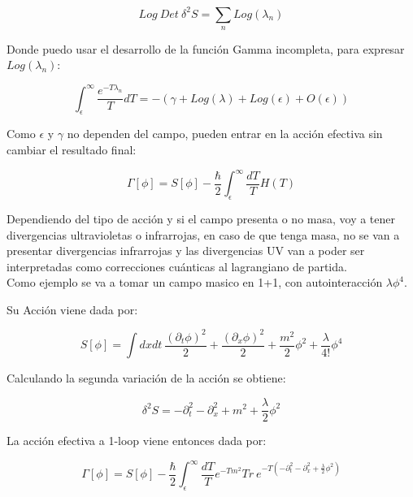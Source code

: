 \begin{equation}
Log \ Det \ \delta ^2 S = 
\sum _n Log( \lambda _n )
\end{equation}

Donde puedo usar el desarrollo de la función Gamma incompleta, para expresar $Log ( \lambda _n )$:

\begin{equation}
\int _ { \epsilon } ^{\infty} \frac{e ^{- T \lambda _n}}{T} dT =
- \left(
		\gamma + Log ( \lambda ) + Log( \epsilon )  + O ( \epsilon  ) 
		\right)
\end{equation}

Como  $ \epsilon $ y $ \gamma $ no dependen del campo, pueden entrar en la acción efectiva sin cambiar el resultado final:

\begin{equation}
\Gamma [ \phi ] = 
S[ \phi ] - 
\frac{\hbar }{2}
\int _ { \epsilon } ^{\infty} \frac{ dT}{T} H(T)
\end{equation}

Dependiendo del tipo de acción y si el campo presenta o no masa, voy a tener divergencias ultravioletas o infrarrojas, en caso de que tenga masa, no se van a presentar divergencias infrarrojas y las divergencias UV van a poder ser interpretadas como correcciones cuánticas al lagrangiano de partida. \\


Como ejemplo se va a tomar un campo masico en 1+1, con autointeracción $\lambda \phi ^4 $.

Su Acción viene dada por:

\begin{equation}
S[ \phi ] = \int dx dt \ 
\frac{( \partial _t \phi ) ^2}{2} +  
\frac{( \partial _x \phi ) ^2}{2} +
\frac{m ^2 }{2} \phi ^2 +
\frac{\lambda}{4!} \phi ^4 
\end{equation}

Calculando la segunda variación de la acción se obtiene:

\begin{equation}
\delta ^2 S = 
- \partial _t ^2 
- \partial _x ^2 
+ m ^2 
+ \frac{\lambda}{2}\phi ^2 
\end{equation}

La acción efectiva a 1-loop viene entonces dada por:

\begin{equation}
\Gamma [ \phi ] = 
S[ \phi ] - 
\frac{\hbar }{2}
\int _ { \epsilon } ^{\infty} \frac{ dT}{T} 
e ^{- T m ^2 }
Tr \  e ^{- T ( - \partial _t ^2 - \partial _x ^2 + \frac{\lambda}{2} \phi ^2 ) }
\end{equation}

